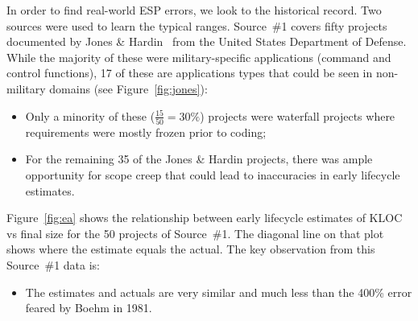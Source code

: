 \documentclass[final,twocolumn]{elsarticle}
\newcommand{\bi}{\begin{itemize}[leftmargin=0.4cm]}
\newcommand{\ei}{\end{itemize}}
\newcommand{\fig}[1]{Figure~\ref{fig:#1}}
\theoremstyle{break}
\begin{document}
In order to find real-world ESP errors,  we look to the historical record. 
Two sources were used to learn the typical ranges. Source~\#1 covers fifty projects documented
by Jones \& Hardin~\cite{jones07a} from the United
States Department of Defense.
  While the majority of
these were military-specific applications (command
and control functions), 17 of these are applications
types that could be seen in non-military domains
(see \fig{jones}):
\bi
\item
 Only a minority of
these ($\frac{15}{50}=30\%$) projects were waterfall
projects where requirements were mostly frozen prior
to coding;
\item
  For the remaining 35 of the Jones \& Hardin projects, there was ample opportunity
  for scope creep that could lead to inaccuracies in early lifecycle estimates.
  \ei
  
\fig{ea} shows the relationship between early lifecycle estimates of KLOC vs final size for the 50
projects of Source~\#1. The diagonal line on that plot shows where the estimate equals the actual.
The key observation from this Source~\#1 data is:
\bi
\item The estimates and actuals are very similar and much less than the 400\% error feared by Boehm in 1981.
  \ei 
\end{document}
